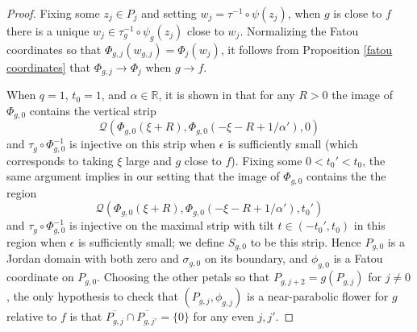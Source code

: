 \documentclass[12pt,letterpaper]{amsart}
\numberwithin{equation}{section}
\theoremstyle{remark}
\theoremstyle{definition}
\newcommand{\R}{\mathbb R}
\newcommand{\QQ}{\mathcal Q}
\begin{document}
 	\begin{proof}
% 		
% 		
	Fixing some $z_j\in P_j$ and setting $w_{j} = \tau^{-1}\circ \psi(z_j)$, when $g$ is close to $f$ there is a unique $w_j\in \tau_g^{-1}\circ \psi_g(z_j)$ close to $w_j$. Normalizing the Fatou coordinates so that $\Phi_{g, j}(w_{g, j}) = \Phi_{j}(w_j)$, it follows from Proposition \ref{fatou coordinates} that $\Phi_{g, j}\to \Phi_{j}$ when $g\to f$.
	
	When $q = 1$, $t_0 = 1$, and $\alpha\in \R$, it is shown in \cite[Lemma 17]{positive_area} that for any $R>0$  
	the image of $\Phi_{g, 0}$ contains the vertical strip 
	$$\QQ(\Phi_{g, 0}(\xi+R), \Phi_{g, 0}(-\xi-R+1/\alpha'), 0)$$
	and $\tau_g\circ \Phi_{g, 0}^{-1}$ is injective on this strip
	when $\epsilon$ is sufficiently small (which corresponds to taking $\xi$ large and $g$ close to $f$). 
	Fixing some $0< t_0'< t_0$, the same argument implies in our setting that the image of 
	$\Phi_{g, 0}$ contains the the region
	$$\QQ(\Phi_{g, 0}(\xi+R), \Phi_{g, 0}(-\xi-R+1/\alpha'), t_0')$$
	and $\tau_g\circ \Phi_{g, 0}^{-1}$ is injective on the maximal strip with tilt $t\in (-t_0', t_0)$ in this region when $\epsilon$ is sufficiently small; we define $S_{g, 0}$ to be this strip. 
	Hence $P_{g, 0}$ is a Jordan domain with both zero and $\sigma_{g, 0}$ on its boundary, and $\phi_{g, 0}$ is a Fatou coordinate on $P_{g, 0}$. Choosing the other petals so that 
	$P_{g, j+2}= g(P_{g, j})$ for $j\neq 0$, the only hypothesis to check that $(P_{g, j}, \phi_{g, j})$ is a near-parabolic flower for $g$ relative to $f$ is that $\overline{P_{g, j}}\cap \overline{P_{g, j'}}=\{0\}$ for any even $j, j'$.  
	

\end{proof}
\end{document}
